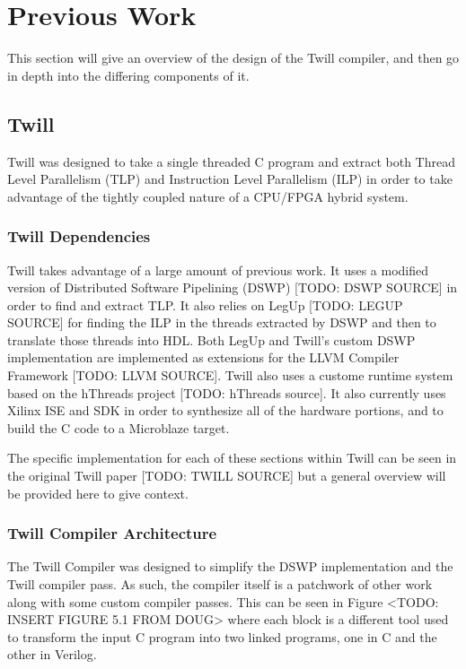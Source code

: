 \chapter{Previous Work}
This section will give an overview of the design of the Twill compiler, and then go in depth into the differing components of it.
\section{Twill}
Twill was designed to take a single threaded C program and extract both Thread Level Parallelism (TLP) and Instruction Level Parallelism (ILP) in order to take advantage of the tightly coupled nature of a CPU/FPGA hybrid system.
\subsection{Twill Dependencies}
Twill takes advantage of a large amount of previous work. It uses a modified version of Distributed Software Pipelining (DSWP) [TODO: DSWP SOURCE] in order to find and extract TLP. It also relies on LegUp [TODO: LEGUP SOURCE] for finding the ILP in the threads extracted by DSWP and then to translate those threads into HDL. Both LegUp and Twill's custom DSWP implementation are implemented as extensions for the LLVM Compiler Framework [TODO: LLVM SOURCE]. Twill also uses a custome runtime system based on the hThreads project [TODO: hThreads source]. It also currently uses Xilinx ISE and SDK in order to synthesize all of the hardware portions, and to build the C code to a Microblaze target.

The specific implementation for each of these sections within Twill can be seen in the original Twill paper [TODO: TWILL SOURCE] but a general overview will be provided here to give context.

\subsection{Twill Compiler Architecture}
The Twill Compiler was designed to simplify the DSWP implementation and the Twill compiler pass. As such, the compiler itself is a patchwork of other work along with some custom compiler passes. This can be seen in Figure <TODO: INSERT FIGURE 5.1 FROM DOUG> where each block is a different tool used to transform the input C program into two linked programs, one in C and the other in Verilog.

